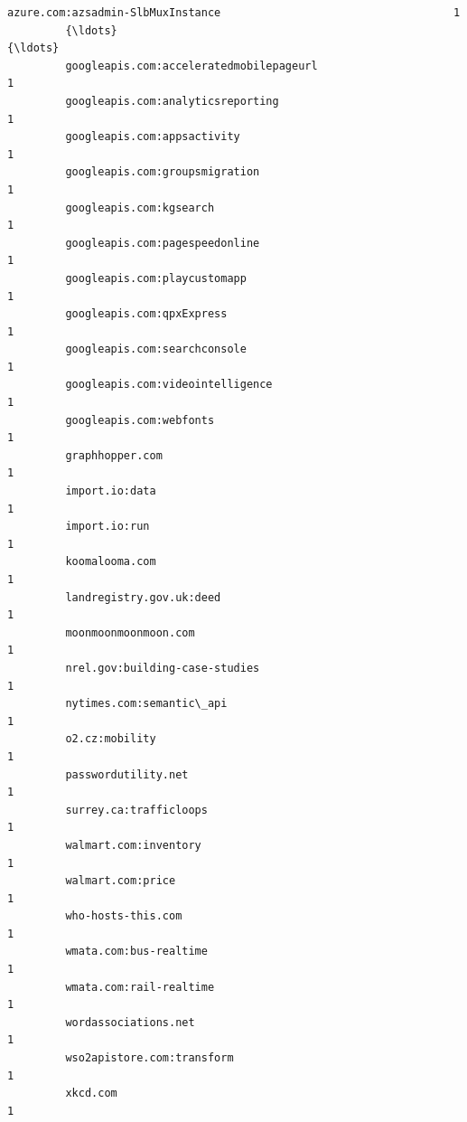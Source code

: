 \documentclass[11pt]{article}
\begin{document}
\begin{Verbatim}[commandchars=\\\{\}]
         azure.com:azsadmin-SlbMuxInstance                                    1   
         {\ldots}                                                                {\ldots}   
         googleapis.com:acceleratedmobilepageurl                              1   
         googleapis.com:analyticsreporting                                    1   
         googleapis.com:appsactivity                                          1   
         googleapis.com:groupsmigration                                       1   
         googleapis.com:kgsearch                                              1   
         googleapis.com:pagespeedonline                                       1   
         googleapis.com:playcustomapp                                         1   
         googleapis.com:qpxExpress                                            1   
         googleapis.com:searchconsole                                         1   
         googleapis.com:videointelligence                                     1   
         googleapis.com:webfonts                                              1   
         graphhopper.com                                                      1   
         import.io:data                                                       1   
         import.io:run                                                        1   
         koomalooma.com                                                       1   
         landregistry.gov.uk:deed                                             1   
         moonmoonmoonmoon.com                                                 1   
         nrel.gov:building-case-studies                                       1   
         nytimes.com:semantic\_api                                             1   
         o2.cz:mobility                                                       1   
         passwordutility.net                                                  1   
         surrey.ca:trafficloops                                               1   
         walmart.com:inventory                                                1   
         walmart.com:price                                                    1   
         who-hosts-this.com                                                   1   
         wmata.com:bus-realtime                                               1   
         wmata.com:rail-realtime                                              1   
         wordassociations.net                                                 1   
         wso2apistore.com:transform                                           1   
         xkcd.com                                                             1   
         

\end{Verbatim}
\end{document}
